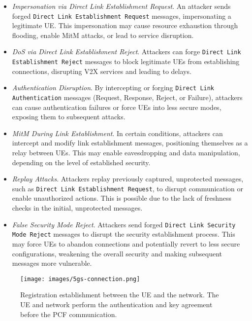 \begin{itemize}
    \item \textit{Impersonation via Direct Link Establishment Request}. An attacker sends forged \texttt{Direct Link Establishment Request} messages, impersonating a legitimate UE. This impersonation may cause resource exhaustion through flooding, enable MitM attacks, or lead to service disruption.
    
    \item \textit{DoS via Direct Link Establishment Reject}. Attackers can forge \texttt{Direct Link Establishment Reject} messages to block legitimate UEs from establishing connections, disrupting V2X services and leading to delays.

    \item \textit{Authentication Disruption}. By intercepting or forging \texttt{Direct Link Authentication} messages (Request, Response, Reject, or Failure), attackers can cause authentication failures or force UEs into less secure modes, exposing them to subsequent attacks.

    \item \textit{MitM During Link Establishment}. In certain conditions, attackers can intercept and modify link establishment messages, positioning themselves as a relay between UEs. This may enable eavesdropping and data manipulation, depending on the level of established security.

    \item \textit{Replay Attacks}. Attackers replay previously captured, unprotected messages, such as \texttt{Direct Link Establishment Request}, to disrupt communication or enable unauthorized actions. This is possible due to the lack of freshness checks in the initial, unprotected messages.

    \item \textit{False Security Mode Reject}. Attackers send forged \texttt{Direct Link Security Mode Reject} messages to disrupt the security establishment process. This may force UEs to abandon connections and potentially revert to less secure configurations, weakening the overall security and making subsequent messages more vulnerable.
\end{itemize}

\begin{figure}[!ht]
     \centering
     \texttt{[image: images/5gs-connection.png]}
     \caption{Registration establishment between the UE and the network. The UE and network perform the authentication and key agreement before the PCF communication.}
     \label{fig:5gs-connection}
\end{figure}

